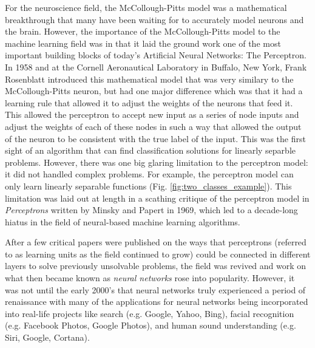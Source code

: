 For the neuroscience field, the McCollough-Pitts model was a mathematical breakthrough that many have been waiting for to accurately model neurons and the brain. However, the importance of the McCollough-Pitts model to the machine learning field was in that it laid the ground work one of the most important building blocks of today's Artificial Neural Networks: The Perceptron. In 1958 and at the Cornell Aeronautical Laboratory in Buffalo, New York, Frank Rosenblatt introduced this mathematical model that was very similary to the McCollough-Pitts neuron, but had one major difference which was that it had a learning rule that allowed it to adjust the weights of the neurons that feed it. This allowed the perceptron to accept new input as a series of node inputs and adjust the weights of each of these nodes in such a way that allowed the output of the neuron to be consistent with the true label of the input. This was the first sight of an algorithm that can find classification solutions for linearly separble problems. However, there was one big glaring limitation to the perceptron model: it did not handled complex problems. For example, the perceptron model can only learn linearly separable functions (Fig. \ref{fig:two_classes_example}). This limitation was laid out at length in a scathing critique of the perceptron model in \textit{Perceptrons} written by Minsky and Papert in 1969, which led to a decade-long hiatus in the field of neural-based machine learning algorithms. 

After a few critical papers were published on the ways that perceptrons (referred to as learning units as the field continued to grow) could be connected in different layers to solve previously unsolvable problems, the field was revived and work on what then became known as \textit{neural networks} rose into popularity. However, it was not until the early 2000's that neural networks truly experienced a period of renaissance with many of the applications for neural networks being incorporated into real-life projects like search (e.g. Google, Yahoo, Bing), facial recognition (e.g. Facebook Photos, Google Photos), and human sound understanding (e.g. Siri, Google, Cortana).

